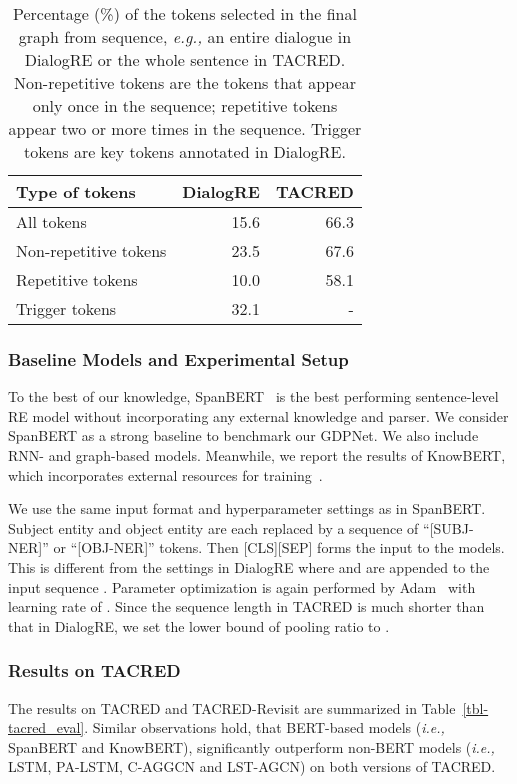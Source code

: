 \documentclass[letterpaper]{article} \usepackage{aaai21}  \usepackage{times}  \usepackage{helvet} \usepackage{courier}  \usepackage[hyphens]{url}  \usepackage{graphicx} \urlstyle{rm} \def\UrlFont{\rm}  \usepackage{graphicx}  \usepackage{natbib}  \usepackage{caption}
\newcommand{\ie}{\emph{i.e.,}\xspace}
\newcommand{\eg}{\emph{e.g.,}\xspace}
\begin{document}
\begin{table}
\small
\centering
\caption{Percentage (\%) of the tokens selected in the final graph from sequence, \eg an entire dialogue in DialogRE or the whole sentence in TACRED. Non-repetitive tokens are the tokens that appear only once in the sequence; repetitive tokens appear two or more times in the sequence. Trigger tokens are key tokens annotated in DialogRE.}
\label{tbl-q_study}
\begin{tabular}{l| r r}
\toprule
 Type of tokens    & DialogRE & TACRED \\
\midrule
All tokens          & 15.6     & 66.3   \\
Non-repetitive tokens & 23.5     & 67.6   \\
Repetitive tokens    & 10.0      & 58.1  \\
Trigger tokens    & 32.1      & -  \\
\bottomrule
\end{tabular}
\end{table}


\subsubsection{Baseline Models and Experimental Setup}
To the best of our knowledge, SpanBERT~\cite{joshi2020spanbert} is the best performing sentence-level RE model without incorporating any external knowledge and parser. We consider SpanBERT as a strong baseline to benchmark our GDPNet. We also include RNN- and graph-based models. Meanwhile, we report the results of KnowBERT, which incorporates external resources for training~\cite{Peters2019KnowledgeEC}.


We use the same input format and hyperparameter settings as in SpanBERT. Subject entity  and object entity  are each replaced by a sequence of ``[SUBJ-NER]'' or ``[OBJ-NER]'' tokens. Then [CLS][SEP] forms the input to the models. This is different from the settings in DialogRE where   and  are appended to the input sequence . Parameter optimization is again performed by Adam~\cite{Kingma2015AdamAM} with learning rate of . Since the sequence length in TACRED is much shorter than that in DialogRE, we set the lower bound of pooling ratio to .




\subsubsection{Results on TACRED}
The results on TACRED and TACRED-Revisit are summarized in Table~\ref{tbl-tacred_eval}. Similar observations hold, that BERT-based models (\ie SpanBERT and KnowBERT), significantly outperform non-BERT models (\ie LSTM, PA-LSTM, C-AGGCN and LST-AGCN) on both versions of TACRED. 
\end{document}
